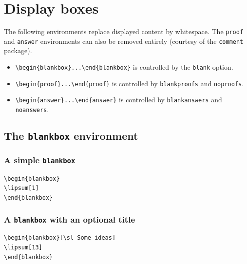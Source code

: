 \documentclass{article}
\theoremstyle{break}
\begin{document}
\section{Display boxes}
The following environments replace displayed content by whitespace. The \verb+proof+ and \verb+answer+ environments can also be removed entirely (courtesy of the \verb+comment+ package).
\begin{itemize}
\item \verb+\begin{blankbox}...\end{blankbox}+ is controlled by the \verb+blank+ option.
\item \verb+\begin{proof}...\end{proof}+ is controlled by \verb+blankproofs+ and \verb+noproofs+.
\item \verb+\begin{answer}...\end{answer}+ is controlled by \verb+blankanswers+ and \verb+noanswers+.
\end{itemize}

\subsection{The {\tt blankbox} environment}

\subsubsection{A simple {\tt blankbox}}

\begin{Verbatim}[frame=single]
\begin{blankbox}
\lipsum[1]
\end{blankbox}
\end{Verbatim}
\begin{blankbox}
\lipsum[1]
\end{blankbox}

\subsubsection{A {\tt blankbox} with an optional title}

\begin{Verbatim}[frame=single]
\begin{blankbox}[\sl Some ideas]
\lipsum[13]
\end{blankbox}
\end{Verbatim}
\begin{blankbox}
\lipsum[13]
\end{blankbox}
\end{document}

